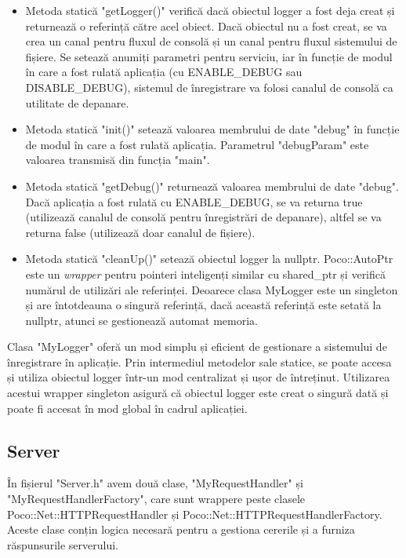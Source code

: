 \begin{itemize}
    \item Metoda statică "getLogger()" verifică dacă obiectul logger a fost deja creat și returnează o referință către acel obiect. Dacă obiectul nu a fost creat, se va crea un canal pentru fluxul de consolă și un canal pentru fluxul sistemului de fișiere. Se setează anumiți parametri pentru serviciu, iar în funcție de modul în care a fost rulată aplicația (cu ENABLE\_DEBUG sau DISABLE\_DEBUG), sistemul de înregistrare va folosi canalul de consolă ca utilitate de depanare.

    \item Metoda statică "init()" setează valoarea membrului de date "debug" în funcție de modul în care a fost rulată aplicația. Parametrul "debugParam" este valoarea transmisă din funcția "main".

    \item Metoda statică "getDebug()" returnează valoarea membrului de date "debug". Dacă aplicația a fost rulată cu ENABLE\_DEBUG, se va returna true (utilizează canalul de consolă pentru înregistrări de depanare), altfel se va returna false (utilizează doar canalul de fișiere).

    \item Metoda statică "cleanUp()" setează obiectul logger la nullptr. Poco::AutoPtr este un \emph{wrapper} pentru pointeri inteligenți similar cu shared\_ptr și verifică numărul de utilizări ale referinței. Deoarece clasa MyLogger este un singleton și are întotdeauna o singură referință, dacă această referință este setată la nullptr, atunci se gestionează automat memoria.
\end{itemize}

Clasa "MyLogger" oferă un mod simplu și eficient de gestionare a sistemului de înregistrare în aplicație. Prin intermediul metodelor sale statice, se poate accesa și utiliza obiectul logger într-un mod centralizat și ușor de întreținut. Utilizarea acestui wrapper singleton asigură că obiectul logger este creat o singură dată și poate fi accesat în mod global în cadrul aplicației.

\subsection{Server}

În fișierul "Server.h" avem două clase, "MyRequestHandler" și "MyRequestHandlerFactory", care sunt wrappere peste clasele Poco::Net::HTTPRequestHandler și Poco::Net::HTTPRequestHandlerFactory. Aceste clase conțin logica necesară pentru a gestiona cererile și a furniza răspunsurile serverului.

